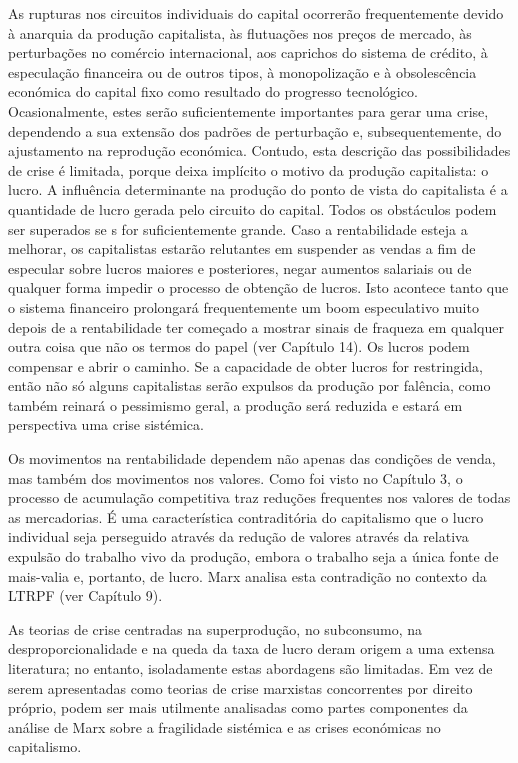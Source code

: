 As rupturas nos circuitos individuais do capital ocorrerão frequentemente devido à anarquia da produção capitalista, às flutuações nos preços de mercado, às perturbações no comércio internacional, aos caprichos do sistema de crédito, à especulação financeira ou de outros tipos, à monopolização e à obsolescência económica do capital fixo como resultado do progresso tecnológico. Ocasionalmente, estes serão suficientemente importantes para gerar uma crise, dependendo a sua extensão dos padrões de perturbação e, subsequentemente, do ajustamento na reprodução económica. Contudo, esta descrição das possibilidades de crise é limitada, porque deixa implícito o motivo da produção capitalista: o lucro. A influência determinante na produção do ponto de vista do capitalista é a quantidade de lucro gerada pelo circuito do capital. Todos os obstáculos podem ser superados se s for suficientemente grande. Caso a rentabilidade esteja a melhorar, os capitalistas estarão relutantes em suspender as vendas a fim de especular sobre lucros maiores e posteriores, negar aumentos salariais ou de qualquer forma impedir o processo de obtenção de lucros. Isto acontece tanto que o sistema financeiro prolongará frequentemente um boom especulativo muito depois de a rentabilidade ter começado a mostrar sinais de fraqueza em qualquer outra coisa que não os termos do papel (ver Capítulo {\color{blue}14}). Os lucros podem compensar e abrir o caminho. Se a capacidade de obter lucros for restringida, então não só alguns capitalistas serão expulsos da produção por falência, como também reinará o pessimismo geral, a produção será reduzida e estará em perspectiva uma crise sistémica.
 \par 
Os movimentos na rentabilidade dependem não apenas das condições de venda, mas também dos movimentos nos valores. Como foi visto no Capítulo 3, o processo de acumulação competitiva traz reduções frequentes nos valores de todas as mercadorias. É uma característica contraditória do capitalismo que o lucro individual seja perseguido através da redução de valores através da relativa expulsão do trabalho vivo da produção, embora o trabalho seja a única fonte de mais-valia e, portanto, de lucro. Marx analisa esta contradição no contexto da LTRPF (ver Capítulo {\color{blue}9}).
 \par 
As teorias de crise centradas na superprodução, no subconsumo, na desproporcionalidade e na queda da taxa de lucro deram origem a uma extensa literatura; no entanto, isoladamente estas abordagens são limitadas. Em vez de serem apresentadas como teorias de crise marxistas concorrentes por direito próprio, podem ser mais utilmente analisadas como partes componentes da análise de Marx sobre a fragilidade sistémica e as crises económicas no capitalismo.
